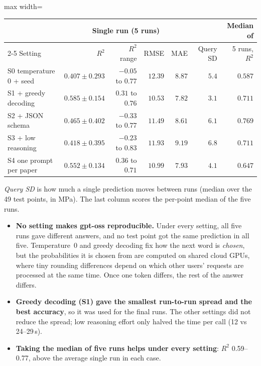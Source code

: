 \documentclass[11pt]{article}
\newcommand{\R}{$R^2$}
\begin{document}
\begin{center}\small
\begin{adjustbox}{max width=\linewidth}
\begin{tabular}{lrrrrrr}
\toprule
& \multicolumn{4}{c}{Single run (5 runs)} & & Median of \\
\cmidrule(lr){2-5}
Setting & \R{} & \R{} range & RMSE & MAE & Query SD & 5 runs, \R{} \\
\midrule
S0 temperature 0 + seed & $0.407\pm0.293$ & $-0.05$ to $0.77$ & $12.39$ & $8.87$ & $5.4$ & $0.587$ \\
\rowcolor{green!12}S1 + greedy decoding & $\mathbf{0.585\pm0.154}$ & $0.31$ to $0.76$ & $\mathbf{10.53}$ & $\mathbf{7.82}$ & $\mathbf{3.1}$ & $0.711$ \\
S2 + JSON schema & $0.465\pm0.402$ & $-0.33$ to $0.77$ & $11.49$ & $8.61$ & $6.1$ & $0.769$ \\
S3 + low reasoning & $0.418\pm0.395$ & $-0.23$ to $0.83$ & $11.93$ & $9.19$ & $6.8$ & $0.711$ \\
S4 one prompt per paper & $0.552\pm0.134$ & $0.36$ to $0.71$ & $10.99$ & $7.93$ & $4.1$ & $0.647$ \\
\bottomrule
\end{tabular}
\end{adjustbox}
\end{center}

\noindent \emph{Query SD} is how much a single prediction moves between runs (median over
the 49 test points, in MPa). The last column scores the per-point median of the five
runs.

\begin{itemize}\itemsep2pt
  \item \textbf{No setting makes gpt-oss reproducible.} Under every setting, all five
        runs gave different answers, and no test point got the same prediction in all
        five. Temperature~0 and greedy decoding fix how the next word is \emph{chosen},
        but the probabilities it is chosen from are computed on shared cloud GPUs, where
        tiny rounding differences depend on which other users' requests are processed at
        the same time. Once one token differs, the rest of the answer differs.
  \item \textbf{Greedy decoding (S1) gave the smallest run-to-run spread and the best
        accuracy}, so it was used for the final runs. The other settings did not reduce
        the spread; low reasoning effort only halved the time per call (12 vs 24--29\,s).
  \item \textbf{Taking the median of five runs helps under every setting}: \R{} 0.59--0.77,
        above the average single run in each case.
\end{itemize}
\end{document}
